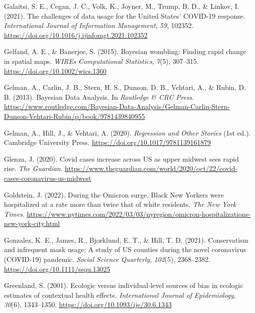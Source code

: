 \documentclass[
]{article}
\newlength{\cslhangindent}
\newlength{\cslentryspacingunit} %
\newenvironment{CSLReferences}[2] %
 {%
  \setlength{\parindent}{0pt}
  \ifodd #1
  \let\oldpar\par
  \def\par{\hangindent=\cslhangindent\oldpar}
  \fi
  \setlength{\parskip}{#2\cslentryspacingunit}
 }%
 {}
\begin{document}
\begin{CSLReferences}{1}{0}
\leavevmode{}%
Galaitsi, S. E., Cegan, J. C., Volk, K., Joyner, M., Trump, B. D., \& Linkov, I. (2021). The challenges of data usage for the {United} {States}' {COVID}-19 response. \emph{International Journal of Information Management}, \emph{59}, 102352. \url{https://doi.org/10.1016/j.ijinfomgt.2021.102352}

\leavevmode{}%
Gelfand, A. E., \& Banerjee, S. (2015). Bayesian wombling: Finding rapid change in spatial maps. \emph{WIREs Computational Statistics}, \emph{7}(5), 307--315. \url{https://doi.org/10.1002/wics.1360}

\leavevmode{}%
Gelman, A., Carlin, J. B., Stern, H. S., Dunson, D. B., Vehtari, A., \& Rubin, D. B. (2013). Bayesian {Data} {Analysis}. In \emph{Routledge \& CRC Press}. \url{https://www.routledge.com/Bayesian-Data-Analysis/Gelman-Carlin-Stern-Dunson-Vehtari-Rubin/p/book/9781439840955}

\leavevmode{}%
Gelman, A., Hill, J., \& Vehtari, A. (2020). \emph{Regression and {Other} {Stories}} (1st ed.). Cambridge University Press. \url{https://doi.org/10.1017/9781139161879}

\leavevmode{}%
Glenza, J. (2020). Covid cases increase across {US} as upper midwest sees rapid rise. \emph{The Guardian}. \url{https://www.theguardian.com/world/2020/oct/22/covid-cases-coronavirus-us-midwest}

\leavevmode{}%
Goldstein, J. (2022). During the {Omicron} surge, {Black} {New} {Yorkers} were hospitalized at a rate more than twice that of white residents. \emph{The New York Times}. \url{https://www.nytimes.com/2022/03/03/nyregion/omicron-hospitalizations-new-york-city.html}

\leavevmode{}%
Gonzalez, K. E., James, R., Bjorklund, E. T., \& Hill, T. D. (2021). Conservatism and infrequent mask usage: {A} study of {US} counties during the novel coronavirus ({COVID}-19) pandemic. \emph{Social Science Quarterly}, \emph{102}(5), 2368--2382. \url{https://doi.org/10.1111/ssqu.13025}

\leavevmode{}%
Greenland, S. (2001). Ecologic versus individual-level sources of bias in ecologic estimates of contextual health effects. \emph{International Journal of Epidemiology}, \emph{30}(6), 1343--1350. \url{https://doi.org/10.1093/ije/30.6.1343}


\end{CSLReferences}
\end{document}
